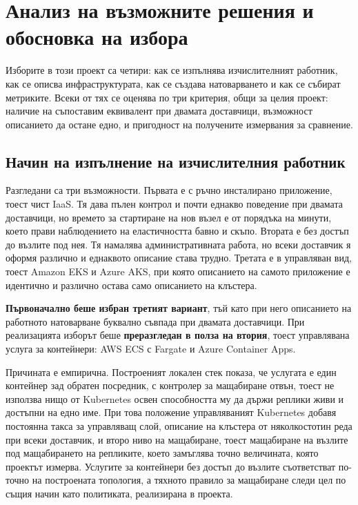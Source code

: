 \section{Анализ на възможните решения и обосновка на избора}
\label{sec:alternatives}

Изборите в този проект са четири: как се изпълнява изчислителният работник, как се
описва инфраструктурата, как се създава натоварването и как се събират метриките.
Всеки от тях се оценява по три критерия, общи за целия проект: наличие на съпоставим
еквивалент при двамата доставчици, възможност описанието да остане едно, и
пригодност на получените измервания за сравнение.

\subsection{Начин на изпълнение на изчислителния работник}

Разгледани са три възможности. Първата е  с ръчно
инсталирано приложение, тоест чист IaaS. Тя дава пълен контрол и почти еднакво
поведение при двамата доставчици, но времето за стартиране на нов възел е от порядъка
на минути, което прави наблюдението на еластичността бавно и скъпо. Втората е
 без достъп до възлите под нея. Тя намалява
административната работа, но всеки доставчик я оформя различно и еднаквото описание
става трудно. Третата е  в управляван вид, тоест Amazon EKS и Azure
AKS, при която описанието на самото приложение е идентично и различно остава само
описанието на клъстера.

\textbf{Първоначално беше избран третият вариант}, тъй като при него описанието на
работното натоварване буквално съвпада при двамата доставчици. При реализацията изборът
беше \textbf{преразгледан в полза на втория}, тоест управлявана услуга за контейнери:
AWS ECS с Fargate и Azure Container Apps.

Причината е емпирична. Построеният локален стек показа, че услугата е един контейнер зад
обратен посредник, с контролер за мащабиране отвън, тоест не използва нищо от
Kubernetes освен способността му да държи  реплики живи и достъпни на едно име.
При това положение управляваният Kubernetes добавя постоянна такса за управляващ слой,
описание на клъстера от няколкостотин реда при всеки доставчик, и второ ниво на
мащабиране, тоест мащабиране на възлите под мащабирането на репликите, което замъглява
точно величината, която проектът измерва. Услугите за контейнери без достъп до възлите
съответстват по-точно на построената топология, а тяхното правило за мащабиране следи цел
по същия начин като политиката, реализирана в проекта.

